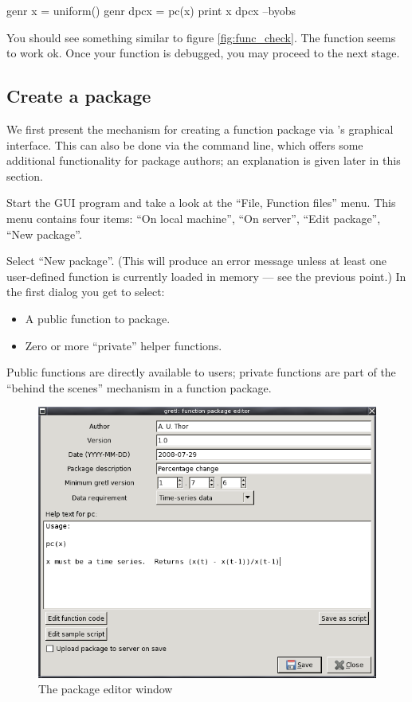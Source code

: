 \begin{code}
genr x = uniform()
genr dpcx = pc(x)
print x dpcx --byobs
\end{code}

You should see something similar to figure \ref{fig:func_check}. The
function seems to work ok.  Once your function is debugged, you
may proceed to the next stage.

\subsection{Create a package}

We first present the mechanism for creating a function package via
's graphical interface. This can also be done via the
command line, which offers some additional functionality for package
authors; an explanation is given later in this section.

Start the GUI program and take a look at the ``File, Function files'' menu.
This menu contains four items: ``On local machine'', ``On server'', ``Edit
package'', ``New package''.

Select ``New package''.  (This will produce an error message unless at
least one user-defined function is currently loaded in memory --- see
the previous point.)  In the first dialog you get to select:

\begin{itemize}
\item A public function to package.
\item Zero or more ``private'' helper functions.
\end{itemize}

Public functions are directly available to users; private functions are
part of the ``behind the scenes'' mechanism in a function package.

\begin{figure}[htbp]
  \centering
  \includegraphics[scale=0.5]{figures/package_editor}
  \caption{The package editor window}
  \label{fig:package_editor}
\end{figure}

